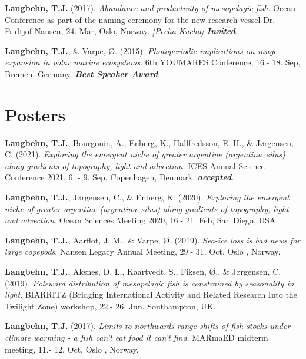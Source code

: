 \documentclass[11pt, a4paper]{awesome-cv}
\begin{document}
\leavevmode\hypertarget{ref-Langbehn2}{}%
\textbf{Langbehn, T.J.} (2017). \emph{Abundance and productivity of
mesopelagic fish}. Ocean Conference as part of the naming ceremony for
the new research vessel Dr. Fridtjof Nansen, 24. Mar, Oslo, Norway.
\emph{{[}Pecha Kucha{]} \textbf{Invited}}.

\leavevmode\hypertarget{ref-Langbehn1}{}%
\textbf{Langbehn, T.J.}, \& Varpe, Ø. (2015). \emph{Photoperiodic
implications on range expansion in polar marine ecosystems}. 6th
YOUMARES Conference, 16.- 18. Sep, Bremen, Germany. \emph{\textbf{Best
Speaker Award}}.

\endgroup

\hypertarget{posters}{%
\section{Posters}\label{posters}}

\begingroup
\setlength{\parindent}{-0.5in}
\setlength{\leftskip}{0.5in}

\hypertarget{refs_posters}{}
\leavevmode\hypertarget{ref-Langbehn13}{}%
\textbf{Langbehn, T.J.}, Bourgouin, A., Enberg, K., Hallfredsson, E. H.,
\& Jørgensen, C. (2021). \emph{Exploring the emergent niche of greater
argentine (argentina~silus) along gradients of topography, light and
advection}. ICES Annual Science Conference 2021, 6. - 9. Sep,
Copenhagen, Denmark. \emph{\textbf{accepted}}.

\leavevmode\hypertarget{ref-Langbehn12}{}%
\textbf{Langbehn, T.J.}, Jørgensen, C., \& Enberg, K. (2020).
\emph{Exploring the emergent niche of greater argentine
(argentina~silus) along gradients of topography, light and advection}.
Ocean Sciences Meeting 2020, 16.- 21. Feb, San Diego, USA.

\leavevmode\hypertarget{ref-Langbehn11}{}%
\textbf{Langbehn, T.J.}, Aarflot, J. M., \& Varpe, Ø. (2019).
\emph{Sea-ice loss is bad news for large copepods}. Nansen Legacy Annual
Meeting, 29.- 31. Oct, Oslo , Norway.

\leavevmode\hypertarget{ref-Langbehn10}{}%
\textbf{Langbehn, T.J.}, Aksnes, D. L., Kaartvedt, S., Fiksen, Ø., \&
Jørgensen, C. (2019). \emph{Poleward distribution of mesopelagic fish is
constrained by seasonality in light}. BIARRITZ (Bridging International
Activity and Related Research Into the Twilight Zone) workshop, 22.- 26.
Jun, Southampton, UK.

\leavevmode\hypertarget{ref-Langbehn9}{}%
\textbf{Langbehn, T.J.} (2017). \emph{Limits to northwards range shifts
of fish stocks under climate warming - a fish can't eat food it can't
find}. MARmaED midterm meeting, 11.- 12. Oct, Oslo , Norway.
\end{document}
